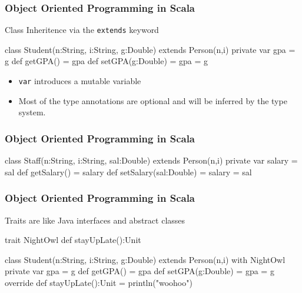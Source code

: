 \documentclass{beamer}
\begin{document}
\begin{frame}[fragile]
\frametitle{Object Oriented Programming in Scala}

Class Inheritence via the {\tt extends} keyword
\begin{code}
class Student(n:String, i:String, g:Double) 
                     extends Person(n,i) {
   private var gpa = g
   def getGPA() = gpa
   def setGPA(g:Double) = {
      gpa = g
   }
}
\end{code}
\begin{itemize}
 \item {\tt var} introduces a mutable variable
 \item Most of the type annotations are optional and will be inferred
   by the type system.
\end{itemize}
\end{frame}


\begin{frame}[fragile]
\frametitle{Object Oriented Programming in Scala}
\begin{code}
class Staff(n:String, i:String, sal:Double) 
                 extends Person(n,i) {
   private var salary = sal
   def getSalary() = salary
   def setSalary(sal:Double) = 
   {
      salary = sal
   }
}
\end{code}
\end{frame}



\begin{frame}[fragile]
\frametitle{Object Oriented Programming in Scala}
Traits are like Java interfaces and abstract classes
\begin{code}
trait NightOwl {
   def stayUpLate():Unit 
}

class Student(n:String, i:String, g:Double) 
      extends Person(n,i) with NightOwl {
   private var gpa = g
   def getGPA() = gpa
   def setGPA(g:Double) = {
      gpa = g
   }
   override def stayUpLate():Unit = { 
      println("woohoo") 
   }
}
\end{code}
\end{frame}
\end{document}
